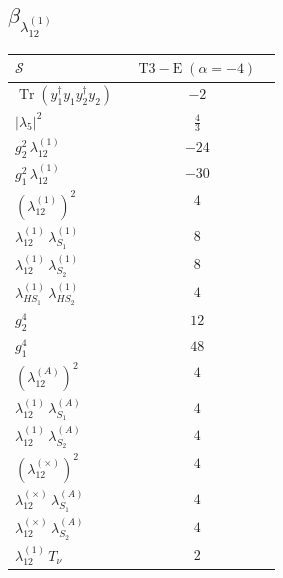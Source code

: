 \documentclass[9pt]{article}
\begin{document}
\subsection*{$ \beta_{\lambda_{12}^{(1)}} $}
\begin{longtable}{@{}p{0.31\linewidth}c@{}}
\toprule
$\mathcal{S}$ & $ \mathrm{T3-E}\;(\alpha=-4) $ \\
\midrule
$ \operatorname{Tr}(y_1^\dagger y_1y_2^\dagger y_2) $ & $ -2 $ \\
$ |\lambda_5|^2 $ & $ \frac{4}{3} $ \\
$ g_2^2\,\lambda_{12}^{(1)} $ & $ -24 $ \\
$ g_1^2\,\lambda_{12}^{(1)} $ & $ -30 $ \\
$ \left(\lambda_{12}^{(1)}\right)^2 $ & $ 4 $ \\
$ \lambda_{12}^{(1)}\,\lambda_{S_1}^{(1)} $ & $ 8 $ \\
$ \lambda_{12}^{(1)}\,\lambda_{S_2}^{(1)} $ & $ 8 $ \\
$ \lambda_{HS_1}^{(1)}\,\lambda_{HS_2}^{(1)} $ & $ 4 $ \\
$ g_2^4 $ & $ 12 $ \\
$ g_1^4 $ & $ 48 $ \\
$ \left(\lambda_{12}^{(A)}\right)^2 $ & $ 4 $ \\
$ \lambda_{12}^{(1)}\,\lambda_{S_1}^{(A)} $ & $ 4 $ \\
$ \lambda_{12}^{(1)}\,\lambda_{S_2}^{(A)} $ & $ 4 $ \\
$ \left(\lambda_{12}^{(\times)}\right)^2 $ & $ 4 $ \\
$ \lambda_{12}^{(\times)}\,\lambda_{S_1}^{(A)} $ & $ 4 $ \\
$ \lambda_{12}^{(\times)}\,\lambda_{S_2}^{(A)} $ & $ 4 $ \\
$ \lambda_{12}^{(1)}\,T_\nu $ & $ 2 $ \\
\bottomrule
\end{longtable}
\end{document}
